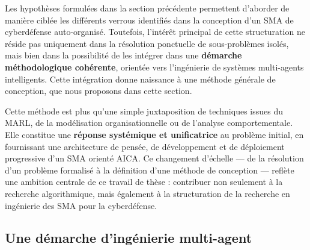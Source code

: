 \documentclass[ twoside,openright,titlepage,numbers=noenddot,headinclude,%
                footinclude=true,cleardoublepage=empty,abstractoff, %
                BCOR=5mm,paper=a4,fontsize=11pt,%
                french,american,%
                ]{scrreprt}
\begin{document}

Les hypothèses formulées dans la section précédente permettent d'aborder de manière ciblée les différents verrous identifiés dans la conception d'un SMA de cyberdéfense auto-organisé. Toutefois, l'intérêt principal de cette structuration ne réside pas uniquement dans la résolution ponctuelle de sous-problèmes isolés, mais bien dans la possibilité de les intégrer dans une \textbf{démarche méthodologique cohérente}, orientée vers l'ingénierie de systèmes multi-agents intelligents. Cette intégration donne naissance à une méthode générale de conception, que nous proposons dans cette section.

Cette méthode est plus qu'une simple juxtaposition de techniques issues du MARL, de la modélisation organisationnelle ou de l'analyse comportementale. Elle constitue une \textbf{réponse systémique et unificatrice} au problème initial, en fournissant une architecture de pensée, de développement et de déploiement progressive d'un SMA orienté AICA. Ce changement d'échelle — de la résolution d'un problème formalisé à la définition d'une méthode de conception — reflète une ambition centrale de ce travail de thèse : contribuer non seulement à la recherche algorithmique, mais également à la structuration de la recherche en ingénierie des SMA pour la cyberdéfense.

\subsection{Une démarche d'ingénierie multi-agent}
\end{document}
